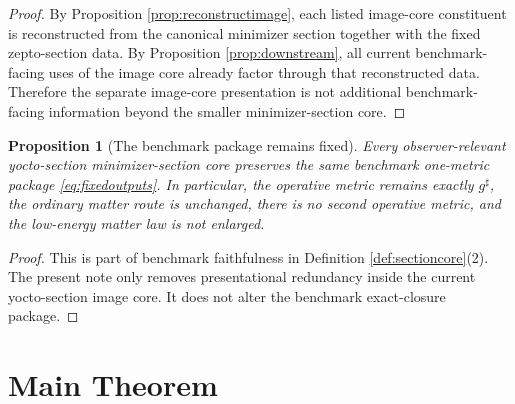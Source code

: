 \documentclass[11pt]{article}
\newcommand{\CompletedMetric}{g^{\sharp}}
\newtheorem{proposition}{Proposition}
\begin{document}
\begin{proof}
By Proposition \ref{prop:reconstructimage}, each listed image-core constituent is reconstructed from the canonical minimizer section together with the fixed zepto-section data. By Proposition \ref{prop:downstream}, all current benchmark-facing uses of the image core already factor through that reconstructed data. Therefore the separate image-core presentation is not additional benchmark-facing information beyond the smaller minimizer-section core.
\end{proof}

\begin{proposition}[The benchmark package remains fixed]
\label{prop:benchmark}
Every observer-relevant yocto-section minimizer-section core preserves the same benchmark one-metric package \eqref{eq:fixedoutputs}. In particular, the operative metric remains exactly \(\CompletedMetric\), the ordinary matter route is unchanged, there is no second operative metric, and the low-energy matter law is not enlarged.
\end{proposition}

\begin{proof}
This is part of benchmark faithfulness in Definition \ref{def:sectioncore}(2). The present note only removes presentational redundancy inside the current yocto-section image core. It does not alter the benchmark exact-closure package.
\end{proof}

\section{Main Theorem}
\end{document}
